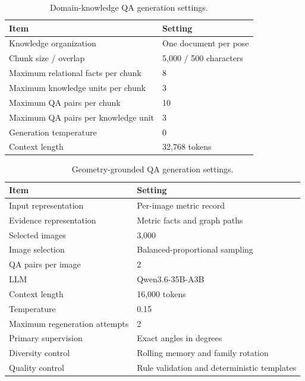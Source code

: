 \begin{table}[h]
\centering
\caption{Domain-knowledge QA generation settings.}
\label{tab:domain_qa_config}
\small
\setlength{\tabcolsep}{4pt}
\renewcommand{\arraystretch}{1.10}
\begin{tabular}{ll}
\toprule
\textbf{Item} & \textbf{Setting} \\
\midrule
Knowledge organization & One document per pose \\
Chunk size / overlap & 5,000 / 500 characters \\
Maximum relational facts per chunk & 8 \\
Maximum knowledge units per chunk & 3 \\
Maximum QA pairs per chunk & 10 \\
Maximum QA pairs per knowledge unit & 3 \\
Generation temperature & 0 \\
Context length & 32,768 tokens \\
\bottomrule
\end{tabular}
\end{table}

\begin{table}[h]
\centering
\caption{Geometry-grounded QA generation settings.}
\label{tab:geometry_qa_settings}
\small
\setlength{\tabcolsep}{4pt}
\renewcommand{\arraystretch}{1.10}
\begin{tabular}{ll}
\toprule
\textbf{Item} & \textbf{Setting} \\
\midrule
Input representation & Per-image metric record \\
Evidence representation & Metric facts and graph paths \\
Selected images & 3,000 \\
Image selection & Balanced-proportional sampling \\
QA pairs per image & 2 \\
LLM & Qwen3.6-35B-A3B~\cite{qwen2026qwen36} \\
Context length & 16,000 tokens \\
Temperature & 0.15 \\
Maximum regeneration attempts & 2 \\
Primary supervision & Exact angles in degrees \\
Diversity control & Rolling memory and family rotation \\
Quality control & Rule validation and deterministic templates \\
\bottomrule
\end{tabular}
\end{table}

